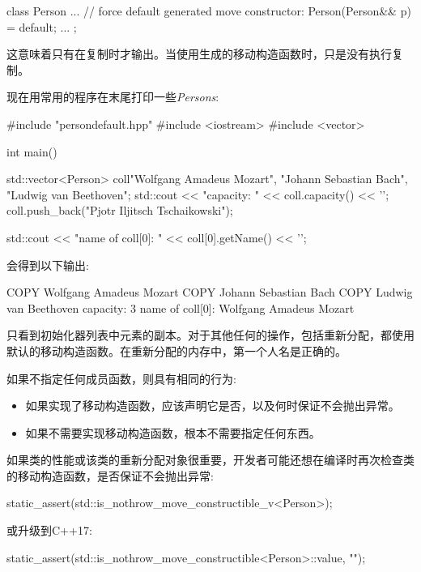 \begin{cppcode}
class Person {
	...
	// force default generated move constructor:
	Person(Person&& p) = default;
	...
};
\end{cppcode}

这意味着只有在复制时才输出。当使用生成的移动构造函数时，只是没有执行复制。

现在用常用的程序在末尾打印一些\textit{Persons}:

\begin{cppcode}
#include "persondefault.hpp"
#include <iostream>
#include <vector>

int main()
{
	std::vector<Person> coll{"Wolfgang Amadeus Mozart",
		"Johann Sebastian Bach",
		"Ludwig van Beethoven"};
	std::cout << "capacity: " << coll.capacity() << '\n';
	coll.push_back("Pjotr Iljitsch Tschaikowski");

	std::cout << "name of coll[0]: " << coll[0].getName() << '\n';
}
\end{cppcode}

会得到以下输出:

\begin{outputcode}
COPY Wolfgang Amadeus Mozart
COPY Johann Sebastian Bach
COPY Ludwig van Beethoven
capacity: 3
name of coll[0]: Wolfgang Amadeus Mozart
\end{outputcode}

只看到初始化器列表中元素的副本。对于其他任何的操作，包括重新分配，都使用默认的移动构造函数。在重新分配的内存中，第一个人名是正确的。

如果不指定任何成员函数，则具有相同的行为:

\begin{itemize}
	\item 如果实现了移动构造函数，应该声明它是否，以及何时保证不会抛出异常。
	\item 如果不需要实现移动构造函数，根本不需要指定任何东西。
\end{itemize}

如果类的性能或该类的重新分配对象很重要，开发者可能还想在编译时再次检查类的移动构造函数，是否保证不会抛出异常:

\begin{cppcode}
static_assert(std::is_nothrow_move_constructible_v<Person>);
\end{cppcode}

或升级到C++17:

\begin{cppcode}
static_assert(std::is_nothrow_move_constructible<Person>::value, "");
\end{cppcode}

